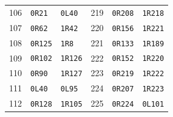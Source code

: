 \begin{longtable}{@{}rll@{\qquad\qquad}rll@{}}
106 & \texttt{0R21} & \texttt{0L40} & 219 & \texttt{0R208} & \texttt{1R218}\\
107 & \texttt{0R62} & \texttt{1R42} & 220 & \texttt{0R156} & \texttt{1R221}\\
108 & \texttt{0R125} & \texttt{1R8} & 221 & \texttt{0R133} & \texttt{1R189}\\
109 & \texttt{0R102} & \texttt{1R126} & 222 & \texttt{0R152} & \texttt{1R220}\\
110 & \texttt{0R90} & \texttt{1R127} & 223 & \texttt{0R219} & \texttt{1R222}\\
111 & \texttt{0L40} & \texttt{0L95} & 224 & \texttt{0R207} & \texttt{1R223}\\
112 & \texttt{0R128} & \texttt{1R105} & 225 & \texttt{0R224} & \texttt{0L101}\\
\end{longtable}

